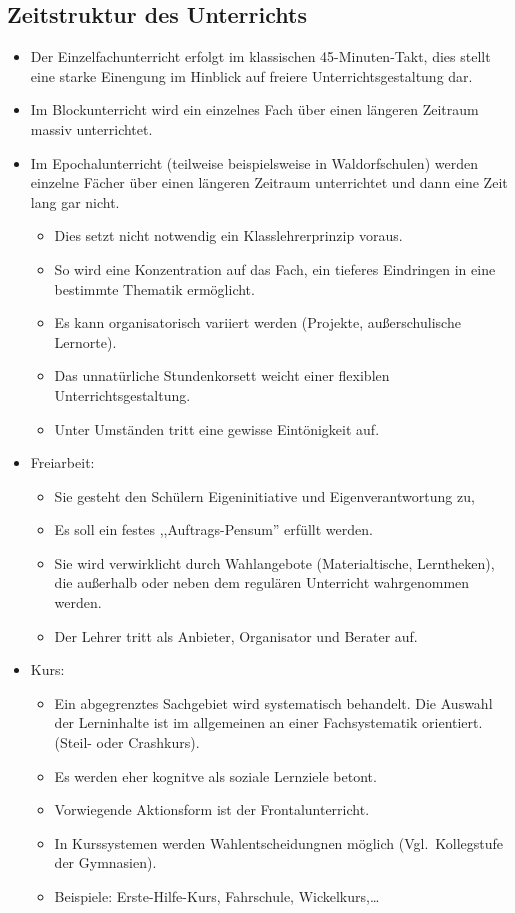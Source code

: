 \subsection{Zeitstruktur des Unterrichts}

\begin{itemize}
\item Der Einzelfachunterricht erfolgt im klassischen
45-Minuten-Takt, dies stellt eine starke Einengung
im Hinblick auf freiere Unterrichtsgestaltung dar.
\item Im Blockunterricht wird ein einzelnes Fach \"{u}ber einen
l\"{a}ngeren Zeitraum massiv unterrichtet.
\item Im Epochalunterricht (teilweise beispielsweise in
Waldorfschulen) werden einzelne F\"{a}cher \"{u}ber einen
l\"{a}ngeren Zeitraum unterrichtet und dann eine Zeit lang gar nicht.
\begin{itemize}
\item Dies setzt nicht notwendig ein Klasslehrerprinzip voraus.
\item So wird eine Konzentration auf das Fach, ein tieferes
Eindringen in
eine bestimmte Thematik erm\"{o}glicht.
\item Es kann organisatorisch variiert werden (Projekte,
au{\ss}erschulische Lernorte).
\item Das unnat\"{u}rliche Stundenkorsett weicht einer
flexiblen Unterrichtsgestaltung.
\item Unter Umst\"{a}nden tritt eine gewisse Eint\"{o}nigkeit auf.
\end{itemize}
\item
Freiarbeit:
\begin{itemize}
\item Sie gesteht den Sch\"{u}lern Eigeninitiative und
Eigenverantwortung zu,
\item Es soll ein festes ,,Auftrags-Pensum'' erf\"{u}llt werden.
\item Sie wird verwirklicht durch Wahlangebote
(Materialtische, Lerntheken), die
au{\ss}erhalb oder neben dem regul\"{a}ren Unterricht
wahrgenommen werden.
\item Der Lehrer tritt als Anbieter, Organisator und Berater auf.
\end{itemize}

\item Kurs:
\begin{itemize}
\item Ein abgegrenztes Sachgebiet wird systematisch behandelt.
Die Auswahl der Lerninhalte ist im
allgemeinen an einer Fachsystematik orientiert.
(Steil- oder Crashkurs).
\item Es werden eher kognitve als soziale Lernziele betont.
\item Vorwiegende Aktionsform ist der Frontalunterricht.
\item In Kurssystemen werden Wahlentscheidungnen m\"{o}glich
(Vgl.\ Kollegstufe der Gymnasien).
\item Beispiele: Erste-Hilfe-Kurs, Fahrschule, Wickelkurs,\dots
\end{itemize}
\end{itemize}


